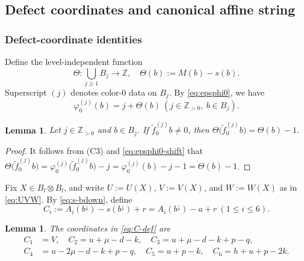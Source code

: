 \documentclass[11pt,reqno]{amsart}
\newcommand{\Z}{\mathbb Z}
\numberwithin{table}{section}
\numberwithin{equation}{section}
\theoremstyle{plain}
\newtheorem{lemma}[theorem]{Lemma}
\theoremstyle{definition}
\begin{document}
\subsection{Defect coordinates and canonical affine string}

\subsubsection{Defect-coordinate identities}

Define the level-independent function
\begin{equation}\label{eq:Theta}
	\Theta:
	\bigcup_{j\ge1}B_j
	\longrightarrow\mathbb Z,
	\quad
	\Theta(b):=M(b)-s(b).
\end{equation}
Superscript \((j)\) denotes color-\(0\) data on \(B_j\).
By \eqref{eq:epsphi0}, we have
\begin{equation}\label{eq:epsphi0-shift}
	\varphi_0^{(j)}(b)=j+\Theta(b)
	\ (j\in\Z_{>0},\ b\in B_j).
\end{equation}

\begin{lemma}\label{lem:affine-drift}
	Let \(j\in\Z_{>0}\) and \(b\in B_j\).
	If \(\widetilde f_0^{(j)}b\ne0\), then $\Theta\bigl(\widetilde f_0^{(j)}b\bigr)
	=
	\Theta(b)-1$.
\end{lemma}

\begin{proof}
	It follows from \textup{(C3)} and \eqref{eq:epsphi0-shift} that $	\Theta\bigl(\widetilde f_0^{(j)}b\bigr)
	=
	\varphi_0^{(j)}
	\bigl(\widetilde f_0^{(j)}b\bigr)-j
	=
	\varphi_0^{(j)}(b)-j-1
	=
	\Theta(b)-1$.
\end{proof}

Fix \(X\in B_l\otimes B_l\), and write
\(U:=U(X)\), \(V:=V(X)\), and \(W:=W(X)\)
as in \eqref{eq:UVW}.
By \eqref{eq:s-bdown}, define
\begin{equation}\label{eq:C-def}
	C_i
	:=
	A_i(b^\downarrow)-s(b^\downarrow)+r
	=
	A_i(b^\downarrow)-a+r
	\ (1\le i\le6).
\end{equation}

\begin{lemma}\label{lem:C-coordinates}
	The coordinates in \eqref{eq:C-def} are
	\begin{equation}\label{eq:C-list}
	\begin{aligned}
		C_1&=V,
		\quad
		C_2=u+\mu-d-k,
		\quad
		C_3=u+\mu-d-k+p-q,\\
		C_4&=u-2\mu-d-k+p-q,
		\quad
		C_5=u+p-k,
		\quad
		C_6=h+u+p-2k.
	\end{aligned}
	\end{equation}
\end{lemma}
\end{document}
